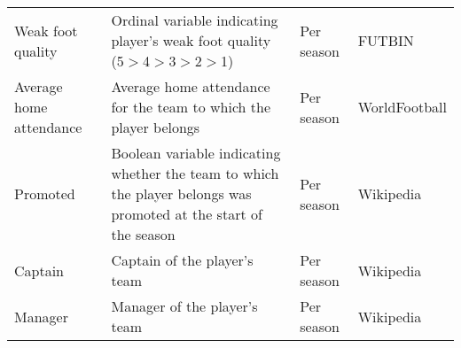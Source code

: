 \begin{table}[htbp]
\begin{spacing}{1.5}
\begin{tabularx}{\textwidth}{p{3cm}Xp{2cm}p{3cm}}
        Weak foot quality & Ordinal variable indicating player's weak foot quality (5$>$4$>$3$>$2$>$1) & Per season & FUTBIN \\
        Average home attendance & Average home attendance for the team to which the player belongs & Per season & WorldFootball \\
        Promoted & Boolean variable indicating whether the team to which the player belongs was promoted at the start of the season & Per season & Wikipedia \\
        Captain & Captain of the player's team & Per season & Wikipedia \\
        Manager & Manager of the player's team & Per season & Wikipedia \\
        \bottomrule
        \bottomrule
    \end{tabularx}%
    \end{spacing}
\end{table}%